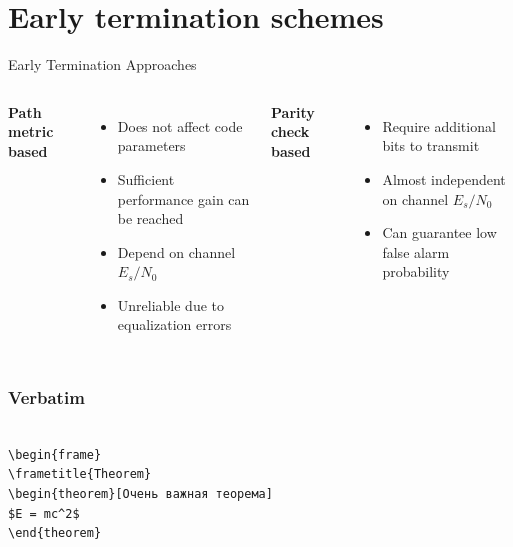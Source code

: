 \section{Early termination schemes}

\begin{frame}{Early Termination Approaches}
  \begin{columns}[t] %
    \textbf{Path metric based}
    \begin{itemize}
    \item Does not affect code parameters
    \item Sufficient performance gain can be reached
    \item Depend on channel $E_s/N_0$
    \item Unreliable due to equalization errors
    \end{itemize}

    \textbf{Parity check based}
    \begin{itemize}
    \item Require additional bits to transmit
    \item Almost independent on channel $E_s/N_0$
    \item Can guarantee low false alarm probability
    \end{itemize}
  \end{columns}
\end{frame}

\begin{frame}[fragile] %
\frametitle{Verbatim}
\begin{example}
\begin{verbatim}

\begin{frame}
\frametitle{Theorem}
\begin{theorem}[Очень важная теорема]
$E = mc^2$
\end{theorem}

\end{verbatim}
\end{example}
\end{frame}

